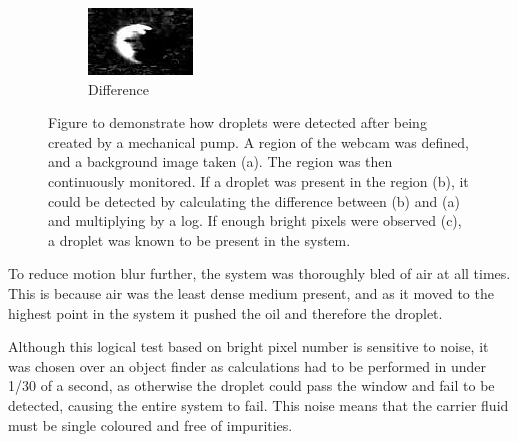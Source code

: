 \documentclass{physics_article_B}
\begin{document}
\begin{figure}[H]
\begin{subfigure}[b]{0.3\textwidth}
                            \includegraphics[width=\textwidth]{Figures/DropFinder/DropFinder3.eps}
                            \caption{Difference}
                            \label{fig:detector:diff}
                        \end{subfigure}
                        \caption{Figure to demonstrate how droplets were detected after being created by a mechanical pump. A region of the webcam was defined, and a background image taken (a). The region was then continuously monitored. If a droplet was present in the region (b), it could be detected by calculating the difference between (b) and (a) and multiplying by a log. If enough bright pixels were observed (c), a droplet was known to be present in the system.}\label{fig:detector}
                    \end{figure}
            
            To reduce motion blur further, the system was thoroughly bled of air at all times. This is because air was the least dense medium present, and as it moved to the highest point in the system it pushed the oil and therefore the droplet. 
            
            Although this logical test based on bright pixel number is sensitive to noise, it was chosen over an object finder as calculations had to be performed in under 1/30 of a second, as otherwise the droplet could pass the window and fail to be detected, causing the entire system to fail. This noise means that the carrier fluid must be single coloured and free of impurities. 
            
\end{document}
